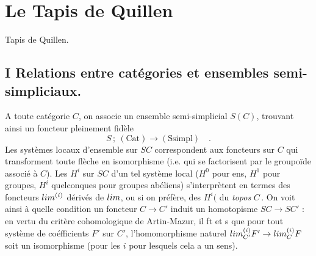 \documentclass[11pt,a4paper]{article}
\begin{document}
\section*{Le Tapis de Quillen}



Tapis de Quillen.

\subsection*{I \quad Relations entre catégories et ensembles semi-simpliciaux.}

A toute catégorie $C$, on associe un ensemble semi-simplicial $S(C)$,
trouvant ainsi un foncteur pleinement fidèle
\[
S\,;\ (\mathrm{Cat}) \longrightarrow (\mathrm{Ssimpl}) \quad .
\]
Les systèmes locaux d'ensemble sur $SC$ correspondent aux foncteurs sur $C$
qui transforment toute flèche en isomorphisme (i.e. qui se factorisent par le
groupoïde associé à $C$). Les $H^{i}$ sur $SC$ d'un tel système local ($H^{0}$
pour ens, $H^{1}$ pour groupes, $H^{i}$ quelconques pour groupes abéliens)
s'interprètent en termes des foncteurs $\varprojlim^{(i)}$ dérivés de
$\varprojlim$, ou si on préfère, des $H^{i}($ du \emph{topos} $C$\,\add{)}. On voit
ainsi à quelle condition un foncteur $C \to C'$ induit un homotopisme
$SC \to SC'$ : en vertu du critère cohomologique de Artin-Mazur, il ft
et s que pour tout système de coéfficients $F'$ sur $C'$,
l'homomorphisme naturel $\varprojlim^{(i)}_{C'} F' \to \varprojlim^{(i)}_{C} F$
soit un isomorphisme (pour les $i$ pour lesquels cela a un sens).
\end{document}

